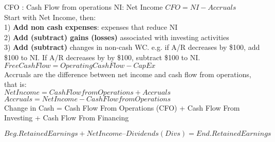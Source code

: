 CFO : Cash Flow from operations
NI: Net Income
$ CFO = NI - Accruals $ \\

Start with Net Income, then: \\
1) \textbf{Add non cash expenses}: expenses that reduce NI \\
2) \textbf{Add (subtract) gains (losses)} associated with investing activities \\
3) \textbf{Add (subtract)} changes in non-cash WC. e.g. if A/R decreases by \$100, add \$100 to NI. If A/R decreases by by \$100, subtract \$100 to NI. \\

$FreeCashFlow = OperatingCashFlow - CapEx$ \\

Accruals are the difference between net income and cash flow from operations, that is: \\

$Net Income = Cash Flow from Operations + Accruals$ \\
$Accruals = Net Income - Cash Flow from Operations$ \\

Change in Cash = Cash Flow From Operations (CFO) + Cash Flow From Investing + Cash Flow From Financing

$Beg. Retained Earnings + Net Income – Dividends(Divs) = End. Retained Earnings$
